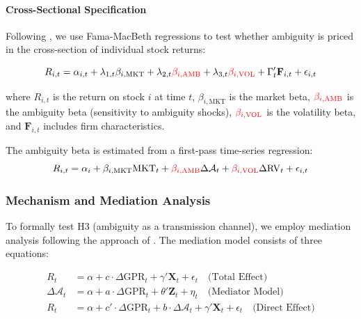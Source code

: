\documentclass[preprint,12pt,authoryear]{elsarticle}
\begin{document}
\paragraph{Cross-Sectional Specification}
Following \citet{Fama1992Cross}, we use Fama-MacBeth regressions to test whether ambiguity is priced in the cross-section of individual stock returns:

\begin{equation}
R_{i,t} = \alpha_{i,t} + \lambda_{1,t} \beta_{i,\text{MKT}} + \lambda_{2,t} {\color{red}\beta_{i,\text{AMB}}} + \lambda_{3,t} {\color{red}\beta_{i,\text{VOL}}} + \Gamma_{t}' \mathbf{F}_{i,t} + \epsilon_{i,t}
\end{equation}

where $R_{i,t}$ is the return on stock $i$ at time $t$, $\beta_{i,\text{MKT}}$ is the market beta, ${\color{red}\beta_{i,\text{AMB}}}$ is the ambiguity beta (sensitivity to ambiguity shocks), ${\color{red}\beta_{i,\text{VOL}}}$ is the volatility beta, and $\mathbf{F}_{i,t}$ includes firm characteristics.

The ambiguity beta is estimated from a first-pass time-series regression:
\begin{equation}
R_{i,t} = \alpha_i + \beta_{i,\text{MKT}} \text{MKT}_t + {\color{red}\beta_{i,\text{AMB}}} \Delta \mathcal{A}_t + {\color{red}\beta_{i,\text{VOL}}} \Delta \text{RV}_t + \epsilon_{i,t}
\end{equation}

\subsubsection{Mechanism and Mediation Analysis}

To formally test H3 (ambiguity as a transmission channel), we employ mediation analysis following the approach of \citet{Baron1986Moderator}. The mediation model consists of three equations:

\begin{align}
R_{t} &= \alpha + c \cdot \Delta \text{GPR}_{t} + \gamma' \mathbf{X}_{t} + \epsilon_{t} \quad \text{(Total Effect)} \\
\Delta \mathcal{A}_{t} &= \alpha + a \cdot \Delta \text{GPR}_{t} + \theta' \mathbf{Z}_{t} + \eta_{t} \quad \text{(Mediator Model)} \\
R_{t} &= \alpha + c' \cdot \Delta \text{GPR}_{t} + b \cdot \Delta \mathcal{A}_{t} + \gamma' \mathbf{X}_{t} + \epsilon_{t} \quad \text{(Direct Effect)}
\end{align}
\end{document}
